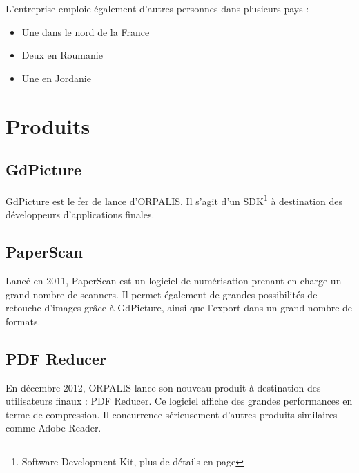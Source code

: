 L'entreprise emploie également d'autres personnes dans plusieurs pays :

\begin{itemize}
\item Une dans le nord de la France
\item Deux en Roumanie
\item Une en Jordanie
\end{itemize}

\section{Produits}

\subsection{GdPicture}

GdPicture est le fer de lance d'ORPALIS. Il s'agit d'un SDK\footnote{Software Development Kit, plus de détails en page \pageref{gdpicture}} à destination des développeurs d'applications finales.

\subsection{PaperScan}

Lancé en 2011, PaperScan est un logiciel de numérisation prenant en charge un grand nombre de scanners. Il permet également de grandes possibilités de retouche d'images grâce à GdPicture, ainsi que l'export dans un grand nombre de formats.

\subsection{PDF Reducer}

En décembre 2012, ORPALIS lance son nouveau produit à destination des utilisateurs finaux : PDF Reducer. Ce logiciel affiche des grandes performances en terme de compression. Il concurrence sérieusement d'autres produits similaires comme Adobe Reader.